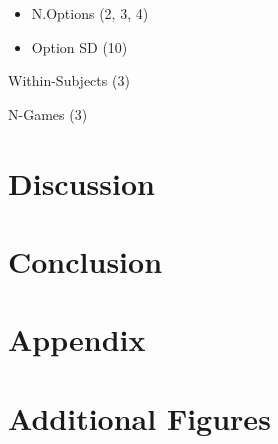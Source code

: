 \documentclass[a4paper,doc,natbib,floatsintext]{apa6}\usepackage[]{graphicx}\usepackage[]{color}
\begin{document}
\begin{itemize}

  \item N.Options (2, 3, 4)
  \item Option SD (10)

\end{itemize}

Within-Subjects (3)

N-Games (3)





\section{Discussion}




\section{Conclusion}


\section{Appendix}


\section{Additional Figures}




\end{document}
